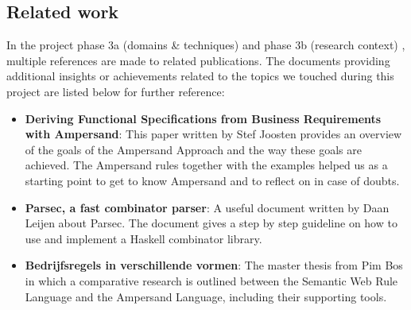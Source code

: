 
\subsection{Related work}
In the project phase 3a (domains \& techniques)  and phase 3b (research context) , multiple references are made to related publications.
The documents providing additional insights or achievements related to the topics we touched during this project are listed below for further reference:

\begin{itemize}
  \item \textbf{Deriving Functional Specifications from Business Requirements with Ampersand}:
    This paper  written by Stef Joosten provides an overview of the goals of the Ampersand Approach and the way these goals are achieved. 
    The Ampersand rules together with the examples helped us as a starting point to get to know Ampersand and to  reflect on in case of doubts.
  \item \textbf{Parsec, a fast combinator parser}:
    A useful document  written by Daan Leijen about Parsec.
    The document gives a step by step guideline on how to use and implement a Haskell combinator library.
  \item \textbf{Bedrijfsregels in verschillende vormen}:
    The master thesis  from Pim Bos in which a comparative research is outlined between the Semantic Web Rule Language and the Ampersand Language, including their supporting tools.
\end{itemize}